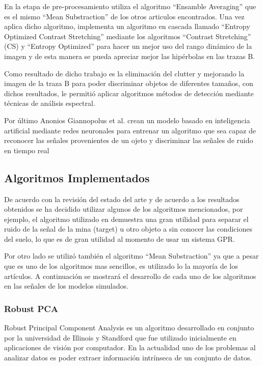 En la etapa de pre-procesamiento utiliza el algoritmo ``Ensamble Averaging''  que es el mismo ``Mean Substraction'' de los otros articulos encontrados. Una vez aplica dicho algoritmo, implementa un algoritmo en cascada llamado ``Entropy Optimized Contrast Stretching'' mediante los algoritmos  ``Contrast Stretching'' (CS) y ``Entropy Optimized'' para hacer un mejor uso del rango dinámico de la imagen y de esta manera se pueda apreciar mejor las hipérbolas en las trazas B.

Como resultado de dicho trabajo es la eliminación del clutter y mejorando la imagen de la traza B para poder discriminar objetos de diferentes tamaños, con dichos resultados, le permitió aplicar algoritmos métodos de detección mediante técnicas de análisis espectral.

Por último Anonios Giannopolus et al. crean un modelo basado en inteligencia artificial mediante redes neuronales  para entrenar un algoritmo que sea capaz de reconocer las señales provenientes de un ojeto y discriminar las señales de ruido en tiempo real \cite{gprMax,Evaluation_of_Signal-to-Clutter_Ratio}

\subsection{Algoritmos Implementados}

De acuerdo con la revisión del estado del arte y de acuerdo a los resultados obtenidos se ha decidido utilizar algunos de los algoritmos mencionados, por ejemplo, el algoritmo utilizado en \cite{Improving_RPCA-Based_Clutter_Suppression} demuestra una gran utilidad para separar el ruido de la señal de la mina (target) u otro objeto a sin conocer las condiciones del suelo, lo que es de gran utilidad al momento de usar un sistema GPR.

Por otro lado se utilizó también el algoritmo ``Mean Substraction'' ya que a pesar que es uno de los algoritmos mas sencillos, es utilizado lo la mayoría de los artículos. A continuación se mostrará el desarrollo de cada uno de los algoritmos en las señales de los modelos simulados.
\subsubsection{Robust PCA}
Robust Principal Component Analysis es un algoritmo  desarrollado en conjunto por la universidad de Illinois y  Standford \cite{Candes:RPCA} que fue utilizado inicialmente en aplicaciones de visión por computador. En la actualidad uno de los problemas al analizar datos es poder extraer información intrínseca de un conjunto de datos. 

